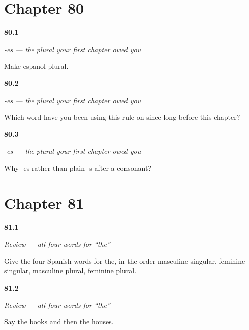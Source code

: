 \section*{Chapter 80}

\noindent\begin{minipage}[t]{\linewidth}
\raggedright
\hypertarget{review-ES-C44-plural-es-espanol}{\textbf{80.1}} \emph{-es — the plural your first chapter owed you}\par
\small Make espanol plural.
\end{minipage}\par\medskip

\noindent\begin{minipage}[t]{\linewidth}
\raggedright
\hypertarget{review-ES-C44-plural-es-already}{\textbf{80.2}} \emph{-es — the plural your first chapter owed you}\par
\small Which word have you been using this rule on since long before this chapter?
\end{minipage}\par\medskip

\noindent\begin{minipage}[t]{\linewidth}
\raggedright
\hypertarget{review-ES-C44-plural-es-why}{\textbf{80.3}} \emph{-es — the plural your first chapter owed you}\par
\small Why -es rather than plain -s after a consonant?
\end{minipage}\par\medskip

\section*{Chapter 81}

\noindent\begin{minipage}[t]{\linewidth}
\raggedright
\hypertarget{review-ES-C44-repaso-articulos-four}{\textbf{81.1}} \emph{Review — all four words for \textquotedblleft{}the\textquotedblright{}}\par
\small Give the four Spanish words for the, in the order masculine singular, feminine singular, masculine plural, feminine plural.
\end{minipage}\par\medskip

\noindent\begin{minipage}[t]{\linewidth}
\raggedright
\hypertarget{review-ES-C44-repaso-articulos-grid}{\textbf{81.2}} \emph{Review — all four words for \textquotedblleft{}the\textquotedblright{}}\par
\small Say the books and then the houses.
\end{minipage}\par\medskip

